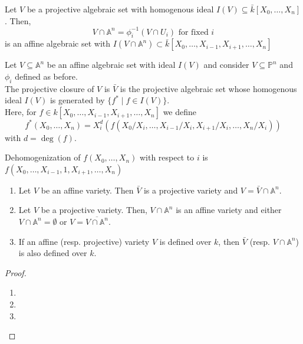 \documentclass[oneside, 12pt, ]{scrbook}
\theoremstyle{theorem}
\begin{document}
Let $V$ be a projective algebraic set with homogenous ideal $I(V) \subseteq \bar{k}[X_{0} ,\hdots , X_{n}]$. Then, $$V \cap \mathbb{A}^n = \phi_{i}^{-1}(V \cap U_{i}) \text{ for fixed } i $$ is an affine algebraic set with $I(V \cap \mathbb{A}^n ) \subset \bar{k}[X_{0} , \hdots , X_{i-1},X_{i+1}, \hdots , X_{n}]$

\begin{definition}
Let $V \subseteq \mathbb{A}^n$ be an affine algebraic set with ideal $I(V)$ and consider $V \subseteq \mathbb{P}^n$ and $\phi_{i}$ defined as before. \\
The projective closure of $V$ is $\bar{V}$ is the projective algebraic set whose homogenous ideal $I(V)$ is generated by $\{f^* \mid f \in I(V)\}$. \\
Here, for $f \in k[X_{0}, \hdots , X_{i-1}, X_{i+1}, \hdots , X_{n}]$ we define $$f^* (X_{0} , \hdots , X_{n}) = X_{i}^d (f(X_{0}/X_{i}, \hdots , X_{i-1}/X_{i}, X_{i+1}/X_{i}, \hdots , X_{n}/X_{i}))$$ with $d = \deg (f)$.
\end{definition}

\begin{definition}
Dehomogenization of $f(X_{0}, \hdots , X_{n})$ with respect to $i$ is $f(X_{0}, \hdots , X_{i-1}, 1 , X_{i+1}, \hdots ,X_{n})$
\end{definition}

\begin{proposition}
\begin{enumerate}
\item Let $V$ be an affine variety. Then $\bar{V}$ is a projective variety and $V = \bar{V} \cap \mathbb{A}^n$. 
\item Let $V$ be a projective variety. Then, $V \cap \mathbb{A}^n$ is an affine variety and either $V \cap \mathbb{A}^n = \emptyset$ or $V = \overline{V \cap \mathbb{A}^n}$. 
\item If an affine (resp. projective) variety $V$ is defined over $k$, then $\bar{V}$ (resp. $V \cap \mathbb{A}^n$) is also defined over $k$.
\end{enumerate}
\end{proposition}

\begin{proof}
\begin{enumerate}
\item 

\item

\item
\end{enumerate}
\end{proof}
\end{document}
